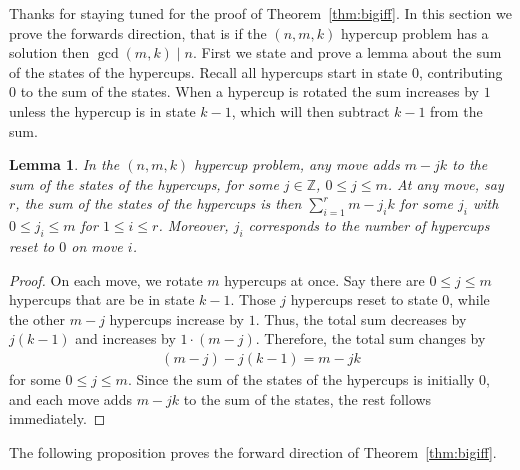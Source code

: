 \documentclass{article}
\theoremstyle{theorem}
\newtheorem{lemma}[theorem]{Lemma}
\theoremstyle{definition}
\begin{document}
Thanks for staying tuned for the proof of Theorem~\ref{thm:bigiff}. In this section we prove the forwards direction, that is if the $(n,m,k)$ hypercup problem has a solution then $\gcd(m,k)\mid n$. First we state and prove a lemma about the sum of the states of the hypercups. Recall all hypercups start in state $0$, contributing $0$ to the sum of the states. When a hypercup is rotated the sum increases by $1$ unless the hypercup is in state $k-1$, which will then subtract $k-1$ from the sum.

\begin{lemma}\label{lem:movesum}
    In the $(n,m,k)$ hypercup problem, any move adds $m-jk$ to the sum of the states of the hypercups, for some $j\in \mathbb{Z}$, $0\le j\le m$. At any move, say $r$, the sum of the states of the hypercups is then $\sum_{i=1}^r m-j_ik$ for some $j_i$ with $0\le j_i \le m$ for $1\le i \le r$. Moreover, $j_i$ corresponds to the number of hypercups reset to $0$ on move $i$.
\end{lemma}

\begin{proof}
     On each move, we rotate $m$ hypercups at once. Say there are $0\le j \le m$ hypercups that are be in state $k-1$. Those $j$ hypercups reset to state $0$, while the other $m-j$ hypercups increase by $1$. Thus, the total sum decreases by $j(k-1)$ and increases by $1\cdot(m-j)$. Therefore, the total sum changes by 
        \begin{align*}
            (m-j)-j(k-1) = m-jk
        \end{align*}
    for some $0\le j\le m$. Since the sum of the states of the hypercups is initially $0$, and each move adds $m-jk$ to the sum of the states, the rest follows immediately.
        \end{proof}


The following proposition proves the forward direction of Theorem~\ref{thm:bigiff}.
\end{document}
